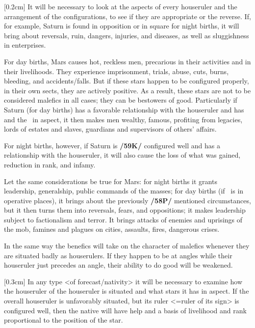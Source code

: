 [0.2cm]
It will be necessary to look at the aspects of every houseruler and the arrangement of the configurations,
to see if they are appropriate or the reverse. If, for example, Saturn is found in opposition or in square for night births, it will bring about reversals, ruin, dangers, injuries, and diseases, as well as sluggishness in
enterprises. 

For day births, Mars causes hot, reckless men, precarious in their activities and in their livelihoods. They experience imprisonment, trials, abuse, cuts, burns, bleeding, and accidents/falls. But \mnmb if these stars happen to be configured properly, in their own sects, they are actively positive. As a result, these stars are not to be considered malefics in all cases; they can be bestowers of good. Particularly if Saturn (for day births) has a favorable relationship with the houseruler and has \Jupiter\, and the \Sun\, in aspect, it then makes men wealthy, famous, profiting from legacies, lords of estates and slaves, guardians and supervisors of others' affairs. 

For night births, however, if Saturn is \textbf{/59K/} configured well and has a relationship with the houseruler, it will also cause the loss of what was gained, reduction in rank, and infamy. 

Let the same considerations be true for Mars: for night births it grants leadership, generalship, public commands of the masses; for day births (if \Mars\, is in operative places), it brings about the previously \textbf{/58P/} mentioned circumstances, but it then turns them into reversals, fears, and oppositions; it makes leadership subject to factionalism and terror. It brings attacks of enemies and uprisings of the mob, famines and plagues on cities, assaults, fires, dangerous crises.

\mnbm[0.2cm]
In the same way the benefics will take on the character of malefics whenever they are situated badly as houserulers. If they happen to be at angles while their houseruler just precedes an angle, their ability to do good will be weakened. 

[0.3cm]
In any type <of forecast/nativity> it will be necessary to examine how the houseruler of the houseruler is situated and what stars it has in aspect. If the overall houseruler is
unfavorably situated, but its ruler <=ruler of its sign> is configured well, then the native will have help and
a basis of livelihood and rank proportional to the position of the star.

\newpage